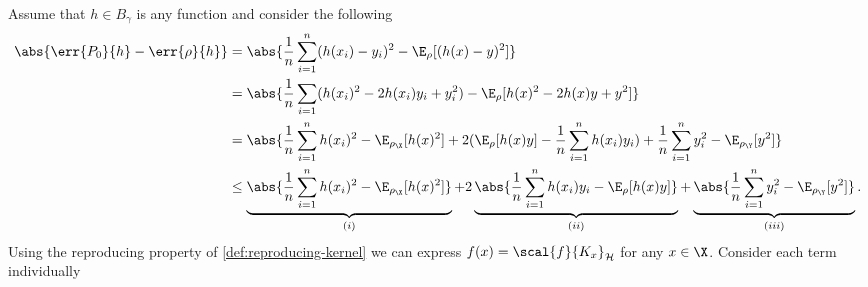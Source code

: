 Assume that \(h \in B_{\gamma}\) is any function and consider the following
\begin{align*}
  \abs{\err{\poolset_0}{h} - \err{\rho}{h}} & = \abs{\frac{1}{n} \sum_{i=1}^{n}(h(x_i) - y_i)^2 - \E_{\rho}[(h(x) - y)^2]} \\
                                            & = \abs{\frac{1}{n} \sum_{i=1}(h(x_i)^2 - 2h(x_i)y_i + y_i^2) - \E_{\rho}[h(x)^2 - 2h(x)y + y^2]} \\
                                            & = \abs{\frac{1}{n} \sum_{i=1}^nh(x_i)^2 - \E_{\rho_{\X}}[h(x)^2] + 2(\E_{\rho}[h(x)y] - \frac{1}{n} \sum_{i=1}^n h(x_i)y_i) + \frac{1}{n} \sum_{i=1}^n y_i^2 - \E_{\rho_{\Y}}[y^2]} \\
                                            & \leq \underbrace{\abs{\frac{1}{n} \sum_{i=1}^nh(x_i)^2 - \E_{\rho_{\X}}[h(x)^2]}}_{(i)} + 2 \underbrace{\abs{\frac{1}{n} \sum_{i=1}^n h(x_i)y_i - \E_{\rho}[h(x)y]}}_{(ii)} + \underbrace{\abs{\frac{1}{n} \sum_{i=1}^n y_i^2 - \E_{\rho_{\Y}}[y^2]}}_{(iii)}.
\end{align*}
Using the reproducing property of \ref{def:reproducing-kernel} we can express
\(f(x) = \scal{f}{K_{x}}_{\rkhs{H}}\) for any \(x \in \X\). Consider each term
individually

